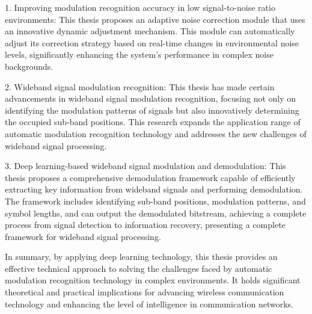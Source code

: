 \begin{ABSTRACT}
1. Improving modulation recognition accuracy in low signal-to-noise ratio environments: This thesis proposes an adaptive noise correction module that uses an innovative dynamic adjustment mechanism. This module can automatically adjust its correction strategy based on real-time changes in environmental noise levels, significantly enhancing the system's performance in complex noise backgrounds.

2. Wideband signal modulation recognition: This thesis has made certain advancements in wideband signal modulation recognition, focusing not only on identifying the modulation patterns of signals but also innovatively determining the occupied sub-band positions. This research expands the application range of automatic modulation recognition technology and addresses the new challenges of wideband signal processing.

3. Deep learning-based wideband signal modulation and demodulation: This thesis proposes a comprehensive demodulation framework capable of efficiently extracting key information from wideband signals and performing demodulation. The framework includes identifying sub-band positions, modulation patterns, and symbol lengths, and can output the demodulated bitstream, achieving a complete process from signal detection to information recovery, presenting a complete framework for wideband signal processing.

In summary, by applying deep learning technology, this thesis provides an effective technical approach to solving the challenges faced by automatic modulation recognition technology in complex environments. It holds significant theoretical and practical implications for advancing wireless communication technology and enhancing the level of intelligence in communication networks.

\end{ABSTRACT}
